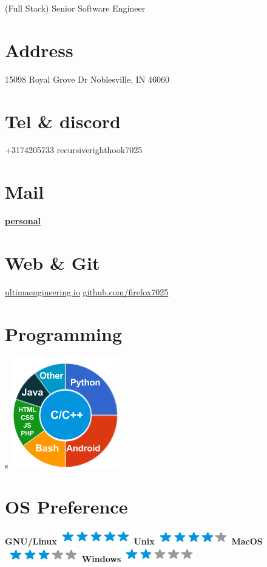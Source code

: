 \documentclass[]{friggeri-cv}
\begin{document}
      {(Full Stack) Senior Software Engineer}
      

\begin{aside}
  \section{Address}
    15098 Royal Grove Dr
    Noblesville, IN 46060
    ~
  \section{Tel \& discord}
    +3174205733
    recursiverighthook7025
    ~
  \section{Mail}
    \href{mailto:alexandermontgomery95@gmail.com}{\textbf{personal}}
    ~
  \section{Web \& Git}
    \href{http://www.ultimaengineering.io}{ultimaengineering.io}
    \href{https://github.com/firefox7025}{github.com/firefox7025}
    ~
  \section{Programming}s
    \includegraphics[scale=0.62]{img/programming.png}
    ~
  \section{OS Preference}
    \textbf{GNU/Linux}\includegraphics[scale=0.40]{img/5stars.png}
    \textbf{Unix}\includegraphics[scale=0.40]{img/4stars.png}
    \textbf{MacOS}\includegraphics[scale=0.40]{img/3stars.png}
    \textbf{Windows}\includegraphics[scale=0.40]{img/2stars.png}
    ~

\end{aside}
\end{document}
